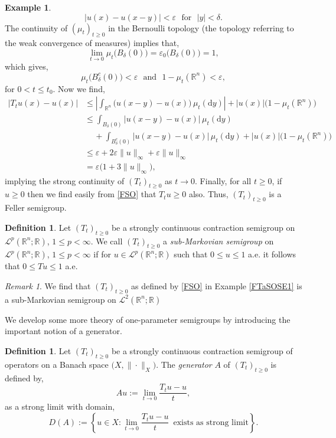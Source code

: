 \documentclass[a4paper, 12pt]{report}
\theoremstyle{cor}
\theoremstyle{remark}
\newtheorem{remark}[theorem]{Remark}
\theoremstyle{definition}
\newtheorem{defn}[theorem]{Definition}
\newtheorem{eg}[theorem]{Example}
\begin{document}
\begin{eg}
$$
|u(x) - u(x - y)| < \varepsilon \,\,\,\, \text{for } \,\, |y| < \delta.
$$
The continuity of $(\mu_t)_{t \ge 0}$ in the Bernoulli topology (the topology referring to the weak convergence of measures) implies that,
$$
\lim_{t \to 0}\mu_t\big(B_\delta(0)\big) = \varepsilon_0\big(B_\delta(0)\big) = 1,
$$
which gives,
$$
\mu_t\big(B_\delta^c(0)\big) < \varepsilon \,\,\,\, \text{and } \,\, 1 - \mu_t(\mathbb{R}^n) < \varepsilon,
$$
for $0 < t \le t_0$.  Now we find,
$$
\begin{aligned}
|T_tu(x) - u(x)| & \le \left|\int_{\mathbb{R}^n}\big(u(x - y) - u(x)\big)\,\mu_t(\mathrm{d}y)\right| + |u(x)|\big(1 - \mu_t(\mathbb{R}^n)\big)\\
& \le \int_{B_\delta(0)}|u(x - y) - u(x)|\,\mu_t(\mathrm{d}y)\\
& \,\,\,\,\,\,\, + \int_{B_\delta^c(0)}|u(x - y) - u(x)|\,\mu_t(\mathrm{d}y) + |u(x)|\big(1 - \mu_t(\mathbb{R}^n)\big)\\
& \le \varepsilon + 2\varepsilon\|u\|_\infty + \varepsilon\|u\|_\infty\\
& = \varepsilon\big(1 + 3\|u\|_\infty\big),
\end{aligned}
$$
implying the strong continuity of $(T_t)_{t \ge 0}$ as $t \to 0$.  Finally, for all $t \ge 0$, if $u \ge 0$ then we find easily from \eqref{FSO} that $T_tu \ge 0$ also.  Thus, $(T_t)_{t \ge 0}$ is a Feller semigroup.
\end{eg}

\begin{defn}
Let $(T_t)_{t \ge 0}$ be a strongly continuous contraction semigroup on $\mathcal{L}^p(\mathbb{R}^n; \mathbb{R})$, $1 \le p < \infty$.  We call $(T_t)_{t \ge 0}$ a \emph{sub-Markovian semigroup} on $\mathcal{L}^p(\mathbb{R}^n; \mathbb{R})$, $1 \le p < \infty$ if for $u \in \mathcal{L}^p(\mathbb{R}^n; \mathbb{R})$ such that $0 \le u \le 1$ a.e. it follows that $0 \le Tu \le 1$ a.e.
\end{defn}
\begin{remark}
We find that $(T_t)_{t \ge 0}$ as defined by \eqref{FSO} in Example \ref{FTaSOSE1} is a sub-Markovian semigroup on $\mathcal{L}^2(\mathbb{R}^n; \mathbb{R})$
\end{remark}

We develop some more theory of one-parameter semigroups by introducing the important notion of a generator.
\begin{defn}
Let $(T_t)_{t \ge 0}$ be a strongly continuous contraction semigroup of operators on a Banach space $\big(X, \|\cdot\|_X\big)$.  The \emph{generator} $A$ of $(T_t)_{t \ge 0}$ is defined by,
\begin{equation}
Au := \lim_{t \to 0}\frac{T_tu - u}{t},
\end{equation}
as a strong limit with domain,
\begin{equation}
D(A) := \left\{u \in X : \lim_{t \to 0}\frac{T_tu - u}{t} \,\,\, \text{exists as strong limit}\right\}.
\end{equation}
\end{defn}
\end{document}
